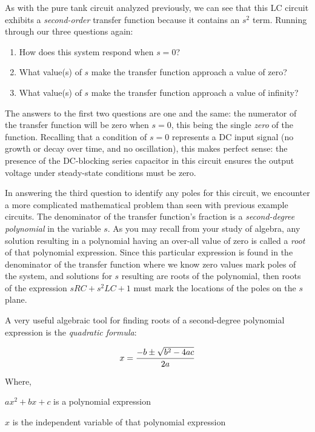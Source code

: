 As with the pure tank circuit analyzed previously, we can see that this LC circuit exhibits a \textit{second-order} transfer function because it contains an $s^2$ term.  Running through our three questions again:

\begin{enumerate}
\item How does this system respond when $s = 0$?
\item What value(s) of $s$ make the transfer function approach a value of zero?
\item What value(s) of $s$ make the transfer function approach a value of infinity?
\end{enumerate}

The answers to the first two questions are one and the same: the numerator of the transfer function will be zero when $s = 0$, this being the single \textit{zero} of the function.  Recalling that a condition of $s = 0$ represents a DC input signal (no growth or decay over time, and no oscillation), this makes perfect sense: the presence of the DC-blocking series capacitor in this circuit ensures the output voltage under steady-state conditions must be zero.

In answering the third question to identify any poles for this circuit, we encounter a more complicated mathematical problem than seen with previous example circuits.  The denominator of the transfer function's fraction is a \textit{second-degree polynomial} in the variable $s$.  As you may recall from your study of algebra, any solution resulting in a polynomial having an over-all value of zero is called a \textit{root} of that polynomial expression.  Since this particular expression is found in the denominator of the transfer function where we know zero values mark poles of the system, and solutions for $s$ resulting are roots of the polynomial, then roots of the expression $sRC + s^2LC + 1$ must mark the locations of the poles on the $s$ plane.    

\vskip 10pt

A very useful algebraic tool for finding roots of a second-degree polynomial expression is the \textit{quadratic formula}:

$$x = {{-b \pm \sqrt{b^2 - 4ac}} \over 2a}$$ 

\noindent
Where,

$ax^2 + bx + c$ is a polynomial expression

$x$ is the independent variable of that polynomial expression

